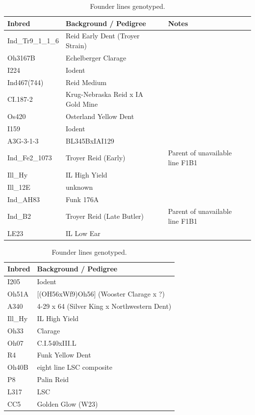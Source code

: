 \begin{table}
\caption{Founder lines genotyped. } %
	\begin{tabular}{ lllll }
	Inbred & Background / Pedigree &  & Notes \\ \hline
	Ind\_Tr9\_1\_1\_6 & Reid Early Dent (Troyer Strain) &  &  \\ 
	Oh3167B & Echelberger Clarage &  &  \\ 
	I224 & Iodent &  &  \\ 
	Ind467(744) & Reid Medium &  &  \\ 
	CI.187-2 & Krug-Nebraska Reid x IA Gold Mine &  &  \\ 
	Os420 & Osterland Yellow Dent &  &  \\ 
	I159 & Iodent &  &  \\ 
	A3G-3-1-3 & BL345BxIAI129 &  &  \\ 
	Ind\_Fe2\_1073 & Troyer Reid (Early) &  & Parent of unavailable line F1B1 \\ 
	Ill\_Hy & IL High Yield &  &  \\ 
	Ill\_12E & unknown &  &  \\ 
	Ind\_AH83 & Funk 176A &  &  \\ 
	Ind\_B2 & Troyer Reid (Late Butler) &  & Parent of unavailable line F1B1 \\ 
	LE23 & IL Low Ear &  &  \\ \hline
	\end{tabular} 
	\bigskip
	
	\begin{tabular}{ll}
	Inbred & Background / Pedigree \\ \hline
	I205 & Iodent   \\ 
	Oh51A & [(OH56xWf9)Oh56] (Wooster Clarage x ?)   \\ 
	A340 & 4-29 x 64 (Silver King x Northwestern Dent)   \\ 
	Ill\_Hy & IL High Yield   \\ 
	Oh33 & Clarage  \\ 
	Oh07 & C.I.540xIII.L  \\ 
	R4 & Funk Yellow Dent   \\ 
	Oh40B & eight line LSC composite  \\ 
	P8 & Palin Reid   \\ 
	L317 & LSC   \\ 
	CC5 & Golden Glow (W23)  \\ 
	\end{tabular}
	

\end{table}
